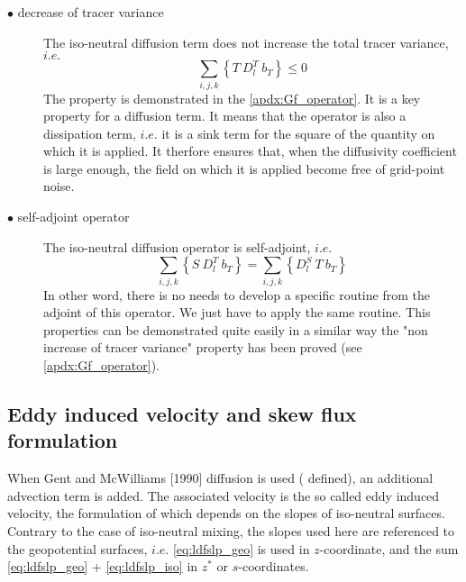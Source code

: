 \documentclass[../main/NEMO_manual]{subfiles}
\begin{document}
\begin{description}
\item[$\bullet$ decrease of tracer variance]
  The iso-neutral diffusion term does not increase the total tracer variance, $i.e.$
  \[
    \sum_{i,j,k} \left\{ T \ D_l^T \ b_T \right\} \leq 0
  \]
The property is demonstrated in the \autoref{apdx:Gf_operator}.
It is a key property for a diffusion term.
It means that the operator is also a dissipation term,
$i.e.$ it is a sink term for the square of the quantity on which it is applied.
It therfore ensures that, when the diffusivity coefficient is large enough,
the field on which it is applied become free of grid-point noise.

\item[$\bullet$ self-adjoint operator]
  The iso-neutral diffusion operator is self-adjoint, $i.e.$
  \[
    \sum_{i,j,k} \left\{ S \ D_l^T \ b_T \right\} = \sum_{i,j,k} \left\{ D_l^S \ T \ b_T \right\}
  \]
In other word, there is no needs to develop a specific routine from the adjoint of this operator.
We just have to apply the same routine.
This properties can be demonstrated quite easily in a similar way the "non increase of tracer variance" property
has been proved (see \autoref{apdx:Gf_operator}).
\end{description}

\subsection{Eddy induced velocity and skew flux formulation}

When Gent and McWilliams [1990] diffusion is used ( defined),
an additional advection term is added.
The associated velocity is the so called eddy induced velocity,
the formulation of which depends on the slopes of iso-neutral surfaces.
Contrary to the case of iso-neutral mixing, the slopes used here are referenced to the geopotential surfaces,
$i.e.$ \autoref{eq:ldfslp_geo} is used in $z$-coordinate,
and the sum \autoref{eq:ldfslp_geo} + \autoref{eq:ldfslp_iso} in $z^*$ or $s$-coordinates. 
\end{document}
